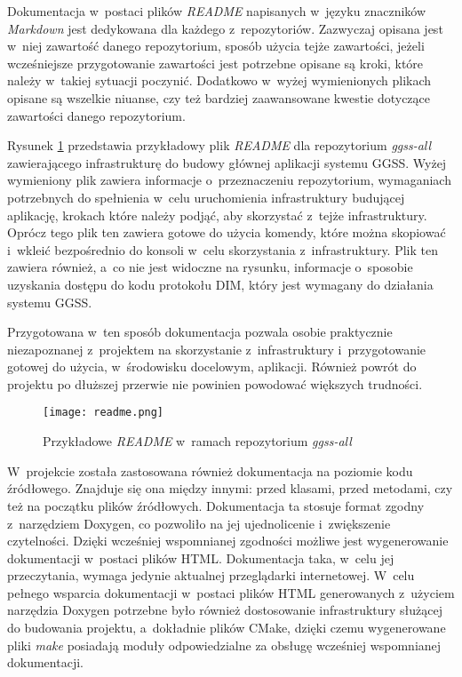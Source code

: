 Dokumentacja w~postaci plików \emph{README} napisanych w~języku znaczników \emph{Markdown} jest dedykowana dla każdego z~repozytoriów. Zazwyczaj opisana jest w~niej zawartość danego repozytorium, sposób użycia tejże zawartości, jeżeli wcześniejsze przygotowanie zawartości jest potrzebne opisane są kroki, które należy w~takiej sytuacji poczynić. Dodatkowo w~wyżej wymienionych plikach opisane są wszelkie niuanse, czy też bardziej zaawansowane kwestie dotyczące zawartości danego repozytorium.

Rysunek \ref{fig:readme} przedstawia przykładowy plik \emph{README} dla repozytorium \emph{ggss-all} zawierającego infrastrukturę do budowy głównej aplikacji systemu GGSS. Wyżej wymieniony plik zawiera informacje o~przeznaczeniu repozytorium, wymaganiach potrzebnych do spełnienia w~celu uruchomienia infrastruktury budującej aplikację, krokach które należy podjąć, aby skorzystać z~tejże infrastruktury. Oprócz tego plik ten zawiera gotowe do użycia komendy, które można skopiować i~wkleić bezpośrednio do konsoli w~celu skorzystania z~infrastruktury. Plik ten zawiera również, a~co nie jest widoczne na rysunku, informacje o~sposobie uzyskania dostępu do kodu protokołu DIM, który jest wymagany do działania systemu GGSS.


Przygotowana w~ten sposób dokumentacja pozwala osobie praktycznie niezapoznanej z~projektem na skorzystanie z~infrastruktury i~przygotowanie gotowej do użycia, w~środowisku docelowym, aplikacji. Również powrót do projektu po dłuższej przerwie nie powinien powodować większych trudności.
\newpage
\begin{figure}[H]
    \centering
    \texttt{[image: readme.png]}
    \caption{Przykładowe \emph{README} w~ramach repozytorium \emph{ggss-all}}
    \label{fig:readme}
\end{figure} %

W~projekcie została zastosowana również dokumentacja na poziomie kodu źródłowego. Znajduje się ona między innymi: przed klasami, przed metodami, czy też na początku plików źródłowych. Dokumentacja ta stosuje format zgodny z~narzędziem Doxygen, co pozwoliło na jej ujednolicenie i~zwiększenie czytelności. Dzięki wcześniej wspomnianej zgodności możliwe jest wygenerowanie dokumentacji w~postaci plików HTML. Dokumentacja taka, w~celu jej przeczytania, wymaga jedynie aktualnej przeglądarki internetowej. W~celu pełnego wsparcia dokumentacji w~postaci plików HTML generowanych z~użyciem narzędzia Doxygen potrzebne było również dostosowanie infrastruktury służącej do budowania projektu, a~dokładnie plików CMake, dzięki czemu wygenerowane pliki \emph{make} posiadają moduły odpowiedzialne za obsługę wcześniej wspomnianej dokumentacji.

